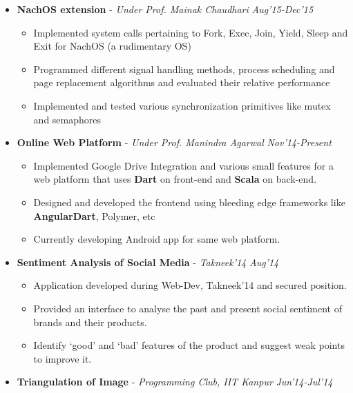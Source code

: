 \documentclass[a4paper,9pt]{extarticle}
\begin{document}
\begin{itemize}
        \item \textbf{NachOS extension} - \textit{Under Prof. Mainak Chaudhari} \hfill \textit{Aug'15-Dec'15}
          \vspace{-2mm}\begin{itemize} \itemsep -2pt
          \item  Implemented system calls pertaining to Fork, Exec, Join, Yield, Sleep and Exit for NachOS (a rudimentary OS)
          \item Programmed different signal handling methods, process scheduling and page replacement algorithms and evaluated
            their relative performance
          \item Implemented and tested various synchronization primitives like
            mutex and semaphores
          \end{itemize}
        \item \textbf{Online Web Platform} - \textit{Under Prof. Manindra Agarwal} \hfill \textit{Nov'14-Present}
          \vspace{-2mm}\begin{itemize} \itemsep -2pt
          \item Implemented Google Drive Integration and various small features for a web platform that uses \textbf{Dart} on front-end and \textbf{Scala} on back-end. 
          \item Designed and developed the frontend using bleeding edge frameworks like \textbf{AngularDart}, Polymer, etc 
          \item Currently developing Android app for same web platform.
          \end{itemize}
        \item  \textbf{Sentiment Analysis of Social Media} - \textit{Takneek'14 }   \hfill \textit{ Aug'14}          
          \vspace{-2mm}\begin{itemize} \itemsep -2pt
          \item Application developed during Web-Dev, Takneek'14 and secured \textbf{} position.
          \item Provided an interface to analyse the past and present social sentiment of brands and their products.
          \item  Identify `good' and `bad' features of the product and suggest weak points to improve it.
          \end{itemize}
        \item
          \textbf{Triangulation of Image} - \textit{ Programming Club, IIT Kanpur }                  \hfill \textit{Jun'14-Jul'14}

\end{itemize}
\end{document}
